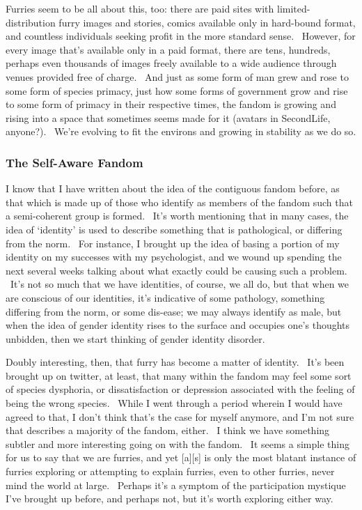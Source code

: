 Furries seem to be all about this, too: there are paid sites with
limited-distribution furry images and stories, comics available only in
hard-bound format, and countless individuals seeking profit in the more
standard sense. ~However, for every image that's available only in a
paid format, there are tens, hundreds, perhaps even thousands of images
freely available to a wide audience through venues provided free of
charge. ~And just as some form of man grew and rose to some form of
species primacy, just how some forms of government grow and rise to some
form of primacy in their respective times, the fandom is growing and
rising into a space that sometimes seems made for it (avatars in
SecondLife, anyone?). ~We're evolving to fit the environs and growing in
stability as we do so.

\subsubsection{The Self-Aware Fandom}\label{the-self-aware-fandom}

I know that I have written about the idea of the contiguous fandom
before, as that which is made up of those who identify as members of the
fandom such that a semi-coherent group is formed. ~It's worth mentioning
that in many cases, the idea of `identity' is used to describe something
that is pathological, or differing from the norm. ~For instance, I
brought up the idea of basing a portion of my identity on my successes
with my psychologist, and we wound up spending the next several weeks
talking about what exactly could be causing such a problem. ~It's not so
much that we have identities, of course, we all do, but that when we are
conscious of our identities, it's indicative of some pathology,
something differing from the norm, or some dis-ease; we may always
identify as male, but when the idea of gender identity rises to the
surface and occupies one's thoughts unbidden, then we start thinking of
gender identity disorder.

Doubly interesting, then, that furry has become a matter of identity.
~It's been brought up on twitter, at least, that many within the fandom
may feel some sort of species dysphoria, or dissatisfaction or
depression associated with the feeling of being the wrong species.
~While I went through a period wherein I would have agreed to that, I
don't think that's the case for myself anymore, and I'm not sure that
describes a majority of the fandom, either. ~I think we have something
subtler and more interesting going on with the fandom. ~It seems a
simple thing for us to say that we are furries, and yet {[}a{]}{[}s{]}
is only the most blatant instance of furries exploring or attempting to
explain furries, even to other furries, never mind the world at large.
~Perhaps it's a symptom of the participation mystique I've brought up
before, and perhaps not, but it's worth exploring either way.

